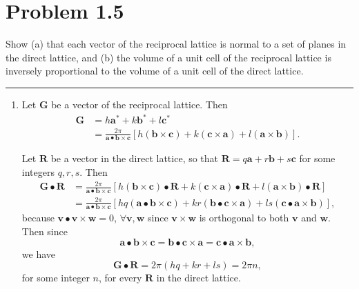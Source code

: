 \documentclass{article}
\newcommand{\horline}
           {\begin{center}
              \noindent\rule{8cm}{0.4pt}
            \end{center}}
\begin{document}
\section*{Problem 1.5}
Show (a) that each vector of the reciprocal lattice is normal to a set of
planes in the direct lattice, and (b) the volume of a unit cell of the 
reciprocal lattice is inversely proportional to the volume of a unit cell
of the direct lattice.
\horline
\begin{enumerate}[label=(\alph*)]
  \item{
  Let $\mathbf{G}$ be a vector of the reciprocal lattice. Then
  \begin{align*}
     \mathbf{G} &= h \mathbf{a^\ast}
                 + k \mathbf{b^\ast} 
                 + l \mathbf{c^\ast} \\
                &= \frac{2\pi}{\mathbf{a} \bullet 
                               \mathbf{b} \times \mathbf{c}}
                     [h (\mathbf{b} \times \mathbf{c})
                    + k (\mathbf{c} \times \mathbf{a})
                    + l (\mathbf{a} \times \mathbf{b})].
  \end{align*}

  Let $\mathbf{R}$ be a vector in the direct lattice, so that
  $\mathbf{R} = q \mathbf{a} + r \mathbf{b} + s \mathbf{c}$ for
  some integers $q, r, s$. Then
  \begin{align*}
    \mathbf{G} \bullet \mathbf{R} 
      &= \frac{2\pi}{\mathbf{a} \bullet \mathbf{b} \times \mathbf{c}}
         \left[h(\mathbf{b} \times \mathbf{c}) \bullet \mathbf{R}
             + k(\mathbf{c} \times \mathbf{a}) \bullet \mathbf{R}
             + l(\mathbf{a} \times \mathbf{b}) \bullet \mathbf{R}\right] \\
      &= \frac{2\pi}{\mathbf{a} \bullet \mathbf{b} \times \mathbf{c}}
         \left[hq(\mathbf{a} \bullet \mathbf{b} \times \mathbf{c})
             + kr(\mathbf{b} \bullet \mathbf{c} \times \mathbf{a})
             + ls(\mathbf{c} \bullet \mathbf{a} \times \mathbf{b})\right],
  \end{align*}
  because $\mathbf{v} \bullet \mathbf{v} \times \mathbf{w} = 0$, 
  $\forall \mathbf{v}, \mathbf{w}$ since $\mathbf{v} \times \mathbf{w}$ is
  orthogonal to both $\mathbf{v}$ and $\mathbf{w}$. Then since
  $$
  \mathbf{a} \bullet \mathbf{b} \times \mathbf{c}
   = \mathbf{b} \bullet \mathbf{c} \times \mathbf{a}
   = \mathbf{c} \bullet \mathbf{a} \times \mathbf{b},
  $$
  we have
  $$
  \mathbf{G} \bullet \mathbf{R} = 2 \pi (hq + kr + ls) = 2 \pi n,
  $$
  for some integer $n$, for every $\mathbf{R}$ in the direct lattice.

}
\end{enumerate}
\end{document}
